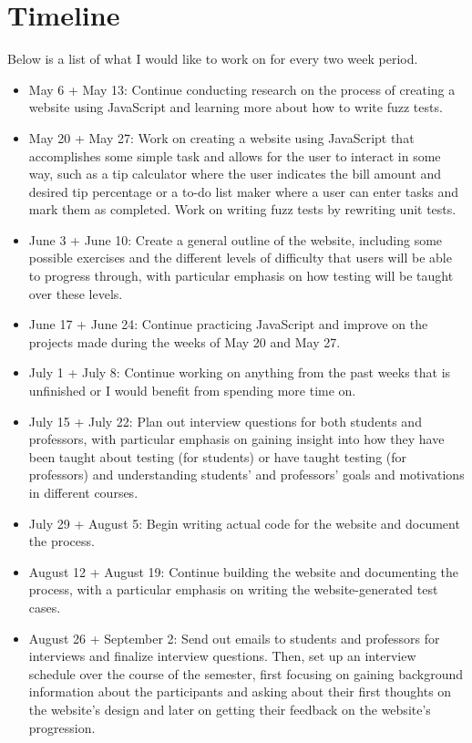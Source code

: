 \documentclass[10pt,twocolumn]{article}
\begin{document}
\section{Timeline}

Below is a list of what I would like to work on for every two week period.

\begin{itemize}
    \item{May 6 + May 13: Continue conducting research on the process of creating a website using JavaScript and learning more about how to write fuzz tests.}
    \item{May 20 + May 27: Work on creating a website using JavaScript that accomplishes some simple task and allows for the user to interact in some way, such as a tip calculator where the user indicates the bill amount and desired tip percentage or a to-do list maker where a user can enter tasks and mark them as completed. Work on writing fuzz tests by rewriting unit tests.}
    \item{June 3 + June 10: Create a general outline of the website, including some possible exercises and the different levels of difficulty that users will be able to progress through, with particular emphasis on how testing will be taught over these levels.}
    \item{June 17 + June 24: Continue practicing JavaScript and improve on the projects made during the weeks of May 20 and May 27.}
    \item{July 1 + July 8: Continue working on anything from the past weeks that is unfinished or I would benefit from spending more time on.}
    \item{July 15 + July 22: Plan out interview questions for both students and professors, with particular emphasis on gaining insight into how they have been taught about testing (for students) or have taught testing (for professors) and understanding students’ and professors’ goals and motivations in different courses.}
    \item{July 29 + August 5: Begin writing actual code for the website and document the process.}
    \item{August 12 + August 19: Continue building the website and documenting the process, with a particular emphasis on writing the website-generated test cases.}
    \item{August 26 + September 2: Send out emails to students and professors for interviews and finalize interview questions. Then, set up an interview schedule over the course of the semester, first focusing on gaining background information about the participants and asking about their first thoughts on the website’s design and later on getting their feedback on the website’s progression.}

\end{itemize}
\end{document}
